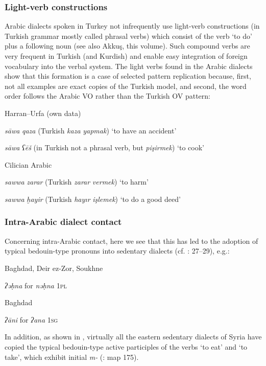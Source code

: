 \documentclass[output=paper]{langsci/langscibook}
\begin{document}
\subsubsection{Light-verb constructions}
Arabic dialects spoken in Turkey not infrequently use light-verb constructions (in Turkish grammar mostly called phrasal verbs) which consist of the verb ‘to do’ plus a following noun (see also Akkuş, this volume). Such compound verbs are very frequent in Turkish (and Kurdish) and enable easy integration of foreign vocabulary into the verbal system. The light verbs found in the Arabic dialects show that this formation is a case of selected pattern replication because, first, not all examples are exact copies of the Turkish model, and second, the word order follows the Arabic VO rather than the Turkish OV pattern:

\ea
Harran--Urfa (own data)

\textit{sāwa} \textit{qaza} (Turkish \textit{kaza} \textit{yapmak}) ‘to have an accident’

\textit{sāwa} \textit{ʕēš} (in Turkish not a phrasal verb, but \textit{pişirmek}) ‘to cook’
\z

\ea
Cilician Arabic \citep[198]{Procházka2002Cukurova} 

\textit{sawwa} \textit{zarar} (Turkish \textit{zarar} \textit{vermek}) ‘to harm’

\textit{sawwa} \textit{ḫayir} (Turkish \textit{hayır} \textit{işlemek}) ‘to do a good deed’
\z

\subsubsection{Intra-Arabic dialect contact}
Concerning intra-Arabic contact, here we see that this has led to the adoption of typical bedouin-type pronouns into sedentary dialects (cf. \citealt{Palva2009}: 27--29), e.g.:

\ea
Baghdad, Deir ez-Zor, Soukhne 

\textit{ʔəḥna} for \textit{nəḥna} \textsc{1pl}
\z

\ea
Baghdad 

\textit{ʔāni} for \textit{ʔana} \textsc{1sg}
\z

In addition, as shown in , virtually all the eastern sedentary dialects of Syria have copied the typical bedouin-type active participles of the verbs ‘to eat’ and ‘to take’, which exhibit initial \textit{m-} (\citealt{Behnstedt1997}: map 175).
\end{document}
